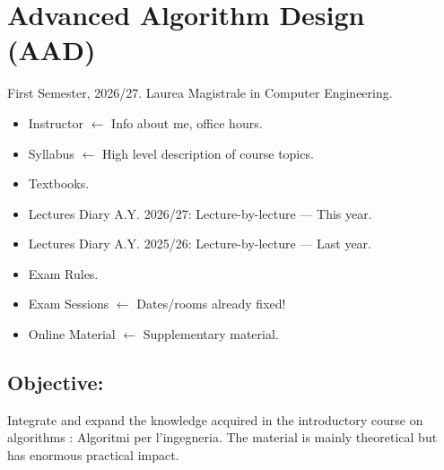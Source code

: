 \section{Advanced Algorithm Design (AAD)}
First Semester, 2026/27. Laurea Magistrale in Computer Engineering.
\begin{itemize}
\item Instructor $\leftarrow$ Info about me, office hours.
\item Syllabus $\leftarrow$ High level description of course topics.
\item Textbooks.
\item Lectures Diary A.Y. 2026/27: Lecture-by-lecture --- This year.
\item Lectures Diary A.Y. 2025/26: Lecture-by-lecture --- Last year.
\item Exam Rules.
\item Exam Sessions $\leftarrow$ Dates/rooms already fixed!
\item Online Material $\leftarrow$ Supplementary material.
\end{itemize}

\subsection{Objective:} Integrate and expand the knowledge acquired in the introductory course on algorithms : Algoritmi per l'ingegneria. 
The material is mainly theoretical but has enormous practical impact.
